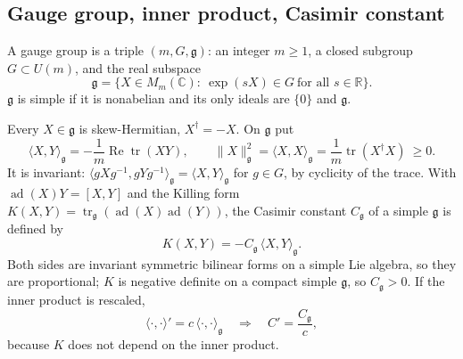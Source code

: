 \subsection{Gauge group, inner product, Casimir constant}
\begin{definition}\label{ym:def:gauge-group}
A gauge group is a triple $(m,G,\mathfrak g)$: an integer $m\ge1$, a closed
subgroup $G\subset U(m)$, and the real subspace
\begin{equation}\label{ym:lie-algebra}
 \mathfrak g=\{X\in M_m(\mathbb C):\ \exp(sX)\in G\ \text{for all }s\in\mathbb R\}.
\end{equation}
$\mathfrak g$ is simple if it is nonabelian and its only ideals are $\{0\}$
and $\mathfrak g$.
\end{definition}
Every $X\in\mathfrak g$ is skew-Hermitian, $X^\dagger=-X$. On $\mathfrak g$ put
\begin{equation}\label{ym:inner}
 \langle X,Y\rangle_{\mathfrak g}=-\frac1m\operatorname{Re}\operatorname{tr}(XY),
 \qquad \|X\|_{\mathfrak g}^2=\langle X,X\rangle_{\mathfrak g}
 =\frac1m\operatorname{tr}(X^\dagger X)\ \ge0 .
\end{equation}
It is invariant: $\langle gXg^{-1},gYg^{-1}\rangle_{\mathfrak g}
=\langle X,Y\rangle_{\mathfrak g}$ for $g\in G$, by cyclicity of the trace.
With $\operatorname{ad}(X)Y=[X,Y]$ and the Killing form
$K(X,Y)=\operatorname{tr}_{\mathfrak g}(\operatorname{ad}(X)\operatorname{ad}(Y))$,
the Casimir constant $C_{\mathfrak g}$ of a simple $\mathfrak g$ is defined by
\begin{equation}\label{ym:casimir}
 K(X,Y)=-C_{\mathfrak g}\,\langle X,Y\rangle_{\mathfrak g}.
\end{equation}
Both sides are invariant symmetric bilinear forms on a simple Lie algebra, so
they are proportional; $K$ is negative definite on a compact simple
$\mathfrak g$, so $C_{\mathfrak g}>0$. If the inner product is rescaled,
\begin{equation}\label{ym:casimir-rescale}
 \langle\cdot,\cdot\rangle'=c\,\langle\cdot,\cdot\rangle_{\mathfrak g}
 \quad\Longrightarrow\quad C'=\frac{C_{\mathfrak g}}{c},
\end{equation}
because $K$ does not depend on the inner product.

